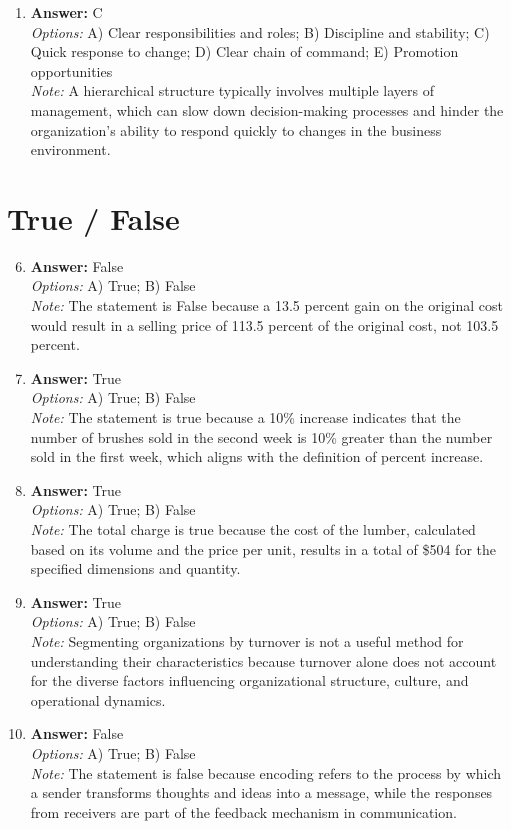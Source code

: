 \documentclass[12pt]{article}
\begin{document}
\begin{enumerate}[label=\arabic*.]
\item \textbf{Answer:} C
\\ \textit{Options:} A) Clear responsibilities and roles; B) Discipline and stability; C) Quick response to change; D) Clear chain of command; E) Promotion opportunities
\\ \textit{Note:} A hierarchical structure typically involves multiple layers of management, which can slow down decision-making processes and hinder the organization's ability to respond quickly to changes in the business environment.
\end{enumerate}

\section*{True / False}
\begin{enumerate}[label=\arabic*.]
\setcounter{enumi}{5}
\item \textbf{Answer:} False
\\ \textit{Options:} A) True; B) False
\\ \textit{Note:} The statement is False because a 13.5 percent gain on the original cost would result in a selling price of 113.5 percent of the original cost, not 103.5 percent.
\item \textbf{Answer:} True
\\ \textit{Options:} A) True; B) False
\\ \textit{Note:} The statement is true because a 10\% increase indicates that the number of brushes sold in the second week is 10\% greater than the number sold in the first week, which aligns with the definition of percent increase.
\item \textbf{Answer:} True
\\ \textit{Options:} A) True; B) False
\\ \textit{Note:} The total charge is true because the cost of the lumber, calculated based on its volume and the price per unit, results in a total of \$504 for the specified dimensions and quantity.
\item \textbf{Answer:} True
\\ \textit{Options:} A) True; B) False
\\ \textit{Note:} Segmenting organizations by turnover is not a useful method for understanding their characteristics because turnover alone does not account for the diverse factors influencing organizational structure, culture, and operational dynamics.
\item \textbf{Answer:} False
\\ \textit{Options:} A) True; B) False
\\ \textit{Note:} The statement is false because encoding refers to the process by which a sender transforms thoughts and ideas into a message, while the responses from receivers are part of the feedback mechanism in communication.
\end{enumerate}
\end{document}
